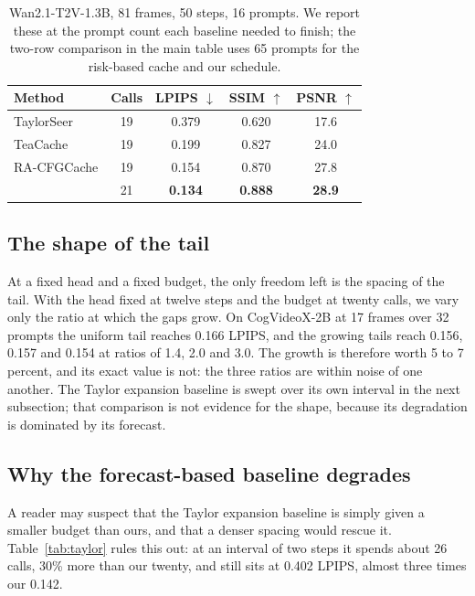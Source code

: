 \begin{table}[h]
\centering\footnotesize\setlength{\tabcolsep}{4pt}
\begin{tabular}{lcccc}
\toprule
Method & Calls & LPIPS $\downarrow$ & SSIM $\uparrow$ & PSNR $\uparrow$ \\
\midrule
TaylorSeer & 19 & 0.379 & 0.620 & 17.6 \\
TeaCache & 19 & 0.199 & 0.827 & 24.0 \\
RA-CFGCache & 19 & 0.154 & 0.870 & 27.8 \\
\method{} & 21 & \textbf{0.134} & \textbf{0.888} & \textbf{28.9} \\
\bottomrule
\end{tabular}
\caption{Wan2.1-T2V-1.3B, 81 frames, 50 steps, 16 prompts. We report these at the prompt count each baseline needed to finish; the two-row comparison in the main table uses 65 prompts for the risk-based cache and our schedule.}
\label{tab:wanfull}
\end{table}

\subsection{The shape of the tail}
\label{app:shape}

At a fixed head and a fixed budget, the only freedom left is the spacing of the tail. With the head fixed at twelve steps and the budget at twenty calls, we vary only the ratio at which the gaps grow. On CogVideoX-2B at 17 frames over 32 prompts the uniform tail reaches 0.166 LPIPS, and the growing tails reach 0.156, 0.157 and 0.154 at ratios of 1.4, 2.0 and 3.0. The growth is therefore worth 5 to 7 percent, and its exact value is not: the three ratios are within noise of one another. The Taylor expansion baseline is swept over its own interval in the next subsection; that comparison is not evidence for the shape, because its degradation is dominated by its forecast.

\subsection{Why the forecast-based baseline degrades}
\label{app:taylor}

A reader may suspect that the Taylor expansion baseline is simply given a smaller budget than ours, and that a denser spacing would rescue it. Table~\ref{tab:taylor} rules this out: at an interval of two steps it spends about 26 calls, 30\% more than our twenty, and still sits at 0.402 LPIPS, almost three times our 0.142.


